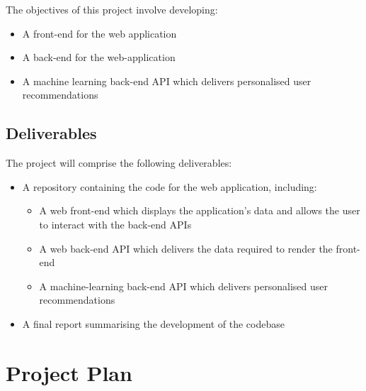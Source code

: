 The objectives of this project involve developing:

\begin{itemize}
    \item A front-end for the web application
    \item A back-end for the web-application
    \item A machine learning back-end API which delivers personalised user recommendations

\end{itemize}

\subsection{Deliverables}


The project will comprise the following deliverables:
\begin{itemize}
    \item A repository containing the code for the web application, including:
        \begin{itemize}
            \item A web front-end which displays the application's data and allows the user to interact with the back-end APIs
            \item A web back-end API which delivers the data required to render the front-end
            \item A machine-learning back-end API which delivers personalised user recommendations 
        \end{itemize}
    \item A final report summarising the development of the codebase
\end{itemize}

%   
%
\section{Project Plan}


